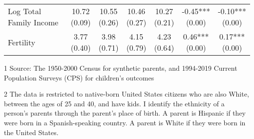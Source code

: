 \begin{table}[H]
{\begin{threeparttable}
\begin{tabular}[t]{>{\raggedright\arraybackslash}p{5cm}cccccc}
Log Total Family Income & \specialcell{10.72\\(0.09)} & \specialcell{10.55\\(0.26)} & \specialcell{10.46\\(0.27)} & \specialcell{10.27\\(0.21)} & \specialcell{-0.45***\\(0.00)} & \specialcell{-0.10***\\(0.00)}\\
Fertility & \specialcell{3.77\\(0.40)} & \specialcell{3.98\\(0.71)} & \specialcell{4.15\\(0.79)} & \specialcell{4.23\\(0.64)} & \specialcell{0.46***\\(0.00)} & \specialcell{0.17***\\(0.00)}\\
\bottomrule
\end{tabular}
\begin{tablenotes}
\item[1] Source: The 1950-2000 Census for synthetic parents, and 1994-2019 Current Population Surveys (CPS) for children's outcomes
\item[2] The data is restricted to native-born United States citizens who are also White, between the ages of 25 and 40, and have kids. I identify the ethnicity of a person's parents through the parent's place of birth. A parent is Hispanic if they were born in a Spanish-speaking country. A parent is White if they were born in the United States.
\end{tablenotes}
\end{threeparttable}}
\end{table}
